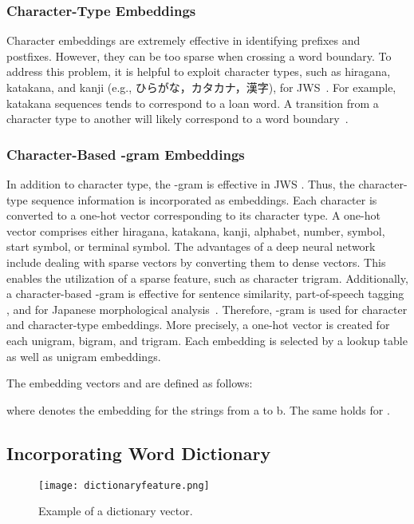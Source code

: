 \documentclass[11pt]{article}
\begin{document}
\subsubsection{Character-Type Embeddings}
Character embeddings are extremely effective in identifying prefixes and
postfixes. However, they can be too sparse when crossing a word boundary.
To address this problem, it is helpful to exploit character types,
such as hiragana, katakana, and kanji (e.g.,
ひらがな，カタカナ，漢字), for JWS~\cite{neubig-nakata-mori:2011:ACL-HLT2011}.
For example, katakana sequences tends to correspond to a loan word. A
transition from a character type to another will likely correspond to a word
boundary~\cite{nagata1999part}.



\subsubsection{Character-Based -gram Embeddings}
In addition to character type, the -gram is effective in JWS \cite{neubig-nakata-mori:2011:ACL-HLT2011}.
Thus, the character-type sequence information is incorporated as embeddings. 
Each character is converted to a one-hot vector corresponding to its character
type. A one-hot vector comprises either hiragana, katakana, kanji,
alphabet, number, symbol, start symbol, or terminal symbol.
The advantages of a deep neural network include dealing with sparse vectors by
converting them to dense vectors.
This enables the utilization of a sparse feature, such as character trigram. 
Additionally, a character-based -gram is effective for sentence similarity,
part-of-speech tagging \cite{wieting-EtAl:2016:EMNLP2016}, and for Japanese
morphological analysis~\cite{neubig-nakata-mori:2011:ACL-HLT2011}. Therefore,
-gram is used for character and character-type embeddings.
More precisely, a one-hot vector is created for each unigram, bigram, and trigram.
Each embedding is selected by a lookup table as well as unigram embeddings.

The embedding vectors  and  are defined as follows:

where  denotes the embedding for the strings from a to b. The
same holds for .

\subsection{Incorporating Word Dictionary}

\begin{figure*}[t]    
 \centering
 \texttt{[image: dictionaryfeature.png]}              
 \caption{Example of a dictionary vector.}    
 \label{dictionaryfeature}    
\end{figure*}
\end{document}
